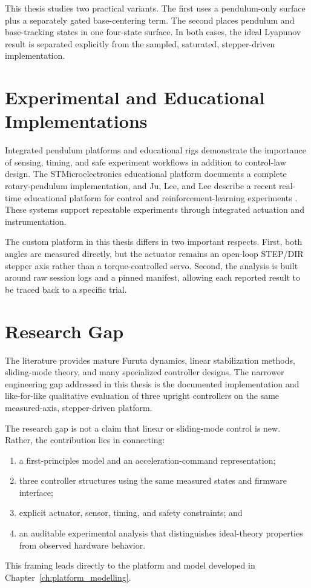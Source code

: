 This thesis studies two practical variants. The first uses a pendulum-only
surface plus a separately gated base-centering term. The second places
pendulum and base-tracking states in one four-state surface. In both cases, the
ideal Lyapunov result is separated explicitly from the sampled, saturated,
stepper-driven implementation.

\section{Experimental and Educational Implementations}
Integrated pendulum platforms and educational rigs demonstrate the importance
of sensing, timing, and safe experiment workflows in addition to control-law
design. The STMicroelectronics educational platform documents a complete
rotary-pendulum implementation, and Ju, Lee, and Lee describe a recent
real-time educational platform for control and reinforcement-learning
experiments \cite{ST_RIP_2019,Ju2025}. These systems support repeatable
experiments through integrated actuation and instrumentation.

The custom platform in this thesis differs in two important respects. First,
both angles are measured directly, but the actuator remains an open-loop
STEP/DIR stepper axis rather than a torque-controlled servo. Second, the
analysis is built around raw session logs and a pinned manifest, allowing each
reported result to be traced back to a specific trial.

\section{Research Gap}
The literature provides mature Furuta dynamics, linear stabilization methods,
sliding-mode theory, and many specialized controller designs. The narrower
engineering gap addressed in this thesis is the documented implementation and
like-for-like qualitative evaluation of three upright controllers on the same
measured-axis, stepper-driven platform.

The research gap is not a claim that linear or sliding-mode control is new.
Rather, the contribution lies in connecting:
\begin{enumerate}
  \item a first-principles model and an acceleration-command representation;
  \item three controller structures using the same measured states and
  firmware interface;
  \item explicit actuator, sensor, timing, and safety constraints; and
  \item an auditable experimental analysis that distinguishes ideal-theory
  properties from observed hardware behavior.
\end{enumerate}

This framing leads directly to the platform and model developed in
Chapter~\ref{ch:platform_modelling}.
